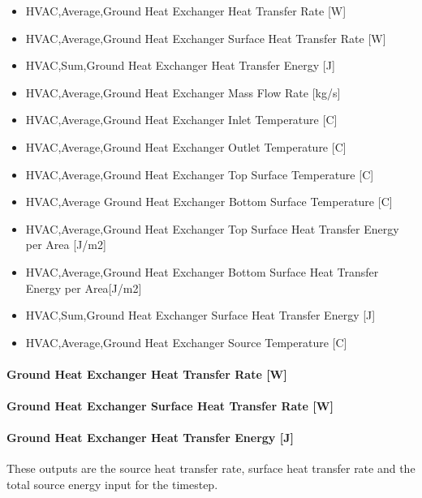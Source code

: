 \begin{itemize}
\item
  HVAC,Average,Ground Heat Exchanger Heat Transfer Rate {[}W{]}
\item
  HVAC,Average,Ground Heat Exchanger Surface Heat Transfer Rate {[}W{]}
\item
  HVAC,Sum,Ground Heat Exchanger Heat Transfer Energy {[}J{]}
\item
  HVAC,Average,Ground Heat Exchanger Mass Flow Rate {[}kg/s{]}
\item
  HVAC,Average,Ground Heat Exchanger Inlet Temperature {[}C{]}
\item
  HVAC,Average,Ground Heat Exchanger Outlet Temperature {[}C{]}
\item
  HVAC,Average,Ground Heat Exchanger Top Surface Temperature {[}C{]}
\item
  HVAC,Average Ground Heat Exchanger Bottom Surface Temperature {[}C{]}
\item
  HVAC,Average,Ground Heat Exchanger Top Surface Heat Transfer Energy per Area {[}J/m2{]}
\item
  HVAC,Average,Ground Heat Exchanger Bottom Surface Heat Transfer Energy per Area{[}J/m2{]}
\item
  HVAC,Sum,Ground Heat Exchanger Surface Heat Transfer Energy {[}J{]}
\item
  HVAC,Average,Ground Heat Exchanger Source Temperature {[}C{]}
\end{itemize}

\paragraph{Ground Heat Exchanger Heat Transfer Rate {[}W{]}}\label{ground-heat-exchanger-heat-transfer-rate-w-2}

\paragraph{Ground Heat Exchanger Surface Heat Transfer Rate {[}W{]}}\label{ground-heat-exchanger-surface-heat-transfer-rate-w}

\paragraph{Ground Heat Exchanger Heat Transfer Energy {[}J{]}}\label{ground-heat-exchanger-heat-transfer-energy-j}

These outputs are the source heat transfer rate, surface heat transfer rate and the total source energy input for the timestep.


